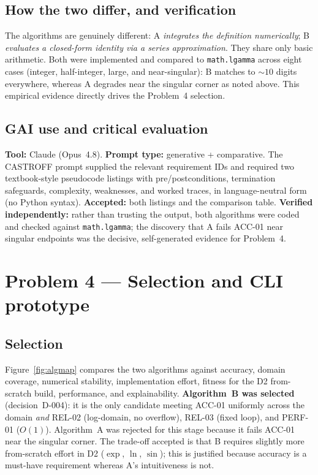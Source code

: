 \documentclass[11pt,a4paper]{article}
\begin{document}
\subsection{How the two differ, and verification}
The algorithms are genuinely different: A \emph{integrates the definition numerically};
B \emph{evaluates a closed-form identity via a series approximation}. They share only
basic arithmetic. Both were implemented and compared to \texttt{math.lgamma} across eight
cases (integer, half-integer, large, and near-singular): B matches to $\sim 10$ digits
everywhere, whereas A degrades near the singular corner as noted above. This empirical
evidence directly drives the Problem~4 selection.

\subsection{GAI use and critical evaluation}
\textbf{Tool:} Claude (Opus~4.8). \textbf{Prompt type:} generative + comparative. The
CASTROFF prompt supplied the relevant requirement IDs and required two textbook-style
pseudocode listings with pre/postconditions, termination safeguards, complexity,
weaknesses, and worked traces, in language-neutral form (no Python syntax).
\textbf{Accepted:} both listings and the comparison table. \textbf{Verified independently:}
rather than trusting the output, both algorithms were coded and checked against
\texttt{math.lgamma}; the discovery that A fails ACC-01 near singular endpoints was the
decisive, self-generated evidence for Problem~4.

\section{Problem 4 --- Selection and CLI prototype}
\label{sec:p4}

\subsection{Selection}
Figure~\ref{fig:algmap} compares the two algorithms against accuracy, domain coverage,
numerical stability, implementation effort, fitness for the D2 from-scratch build,
performance, and explainability. \textbf{Algorithm~B was selected} (decision~D-004): it
is the only candidate meeting ACC-01 uniformly across the domain \emph{and} REL-02
(log-domain, no overflow), REL-03 (fixed loop), and PERF-01 ($O(1)$). Algorithm~A was
rejected for this stage because it fails ACC-01 near the singular corner. The trade-off
accepted is that B requires slightly more from-scratch effort in D2 ($\exp$, $\ln$,
$\sin$); this is justified because accuracy is a must-have requirement whereas A's
intuitiveness is not.
\end{document}
